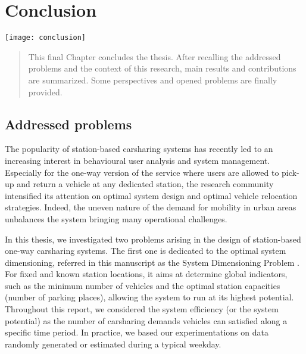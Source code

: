 \chapter{Conclusion} \label{chap:conclusion}
\minitoc
\vspace{4cm}
\begin{minipage}[c]{0.35\linewidth}
\texttt{[image: conclusion]}
\end{minipage}
\hfill
\begin{minipage}[c]{0.6\linewidth}
\begin{abstract}
This final Chapter concludes the thesis.
After recalling the addressed problems and the context of this research, main results and contributions are summarized.
Some perspectives and opened problems are finally provided.
\end{abstract}
\end{minipage}



\newpage
\section{Addressed problems}
The popularity of station-based carsharing systems has recently led to an increasing interest in behavioural user analysis and system management.
Especially for the one-way version of the service where users are allowed to pick-up and return a vehicle at any dedicated station, the research community intensified its attention on optimal system design and optimal vehicle relocation strategies.
Indeed, the uneven nature of the demand for mobility in urban areas unbalances the system bringing many operational challenges.


\medskip
In this thesis, we investigated two problems arising in the design of station-based one-way carsharing systems.
The first one is dedicated to the optimal system dimensioning, referred in this manuscript as the System Dimensioning Problem {\SDP}.
For fixed and known station locations, it aims at determine global indicators, such as the minimum number of vehicles and the optimal station capacities (number of parking places), allowing the system to run at its highest potential.
Throughout this report, we considered the system efficiency (or the system potential) as the number of carsharing demands vehicles can satisfied along a specific time period.
In practice, we based our experimentations on data randomly generated or estimated during a typical weekday.%

